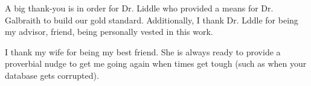 \label{acknowledgements}
A big thank-you is in order for Dr. Liddle who provided a means for Dr. Galbraith to build our gold standard. Additionally, I thank Dr. Lddle for being my advisor, friend, being personally vested in this work. 

I thank my wife for being my best friend. She is always ready to provide a proverbial nudge to get me going again when times get tough (such as when your database gets corrupted).

